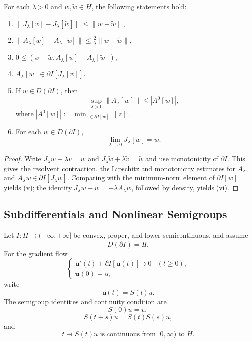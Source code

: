\begin{theorem}
\label{thm:properties-resolvent-yosida}
For each $\lambda > 0$ and $w, \tilde{w} \in H$, the following statements hold:
\begin{enumerate}
\item[(i)] $\|J_\lambda[w] - J_\lambda[\tilde{w}]\| \le \|w - \tilde{w}\|$,
\item[(ii)] $\|A_\lambda[w] - A_\lambda[\tilde{w}]\| \le \frac{2}{\lambda}\|w - \tilde{w}\|$,
\item[(iii)] $0 \le (w - \tilde{w}, A_\lambda[w] - A_\lambda[\tilde{w}])$,
\item[(iv)] $A_\lambda[w] \in \partial I[J_\lambda[w]]$.
\item[(v)] If $w \in D(\partial I)$, then
\[
\sup_{\lambda > 0} \|A_\lambda[w]\| \le |A^0[w]|,
\]
where $|A^0[w]| := \min_{z \in \partial I[w]} \|z\|$.
\item[(vi)] For each $w \in \overline{D(\partial I)}$,
\[
\lim_{\lambda \to 0} J_\lambda[w] = w.
\]
\end{enumerate}
\end{theorem}

\begin{proof}
\sketch Write $J_\lambda w+\lambda v=w$ and $J_\lambda\tilde w+\lambda\tilde v=\tilde w$ and use monotonicity of $\partial I$. This gives the resolvent contraction, the Lipschitz and monotonicity estimates for $A_\lambda$, and $A_\lambda w\in\partial I[J_\lambda w]$. Comparing with the minimum-norm element of $\partial I[w]$ yields (v); the identity $J_\lambda w-w=-\lambda A_\lambda w$, followed by density, yields (vi).
\end{proof}

\subsection{Subdifferentials and Nonlinear Semigroups}
\label{sec:subdifferentials-nonlinear-semigroups}

Let $I:H\to(-\infty,+\infty]$ be convex, proper, and lower semicontinuous, and assume
\[
\overline{D(\partial I)}=H.
\tag{8}
\]
For the gradient flow
\[
\begin{cases}
\mathbf u'(t)+\partial I[\mathbf u(t)]\ni0 & (t\geq0),\\
\mathbf u(0)=u,
\end{cases}
\tag{9}
\]
write
\[
\mathbf u(t)=S(t)u.
\tag{10}
\]
The semigroup identities and continuity condition are
\[
S(0)u=u,
\tag{11}
\]
\[
S(t+s)u=S(t)S(s)u,
\tag{12}
\]
and
\[
t\longmapsto S(t)u\text{ is continuous from }[0,\infty)\text{ to }H.
\tag{13}
\]

